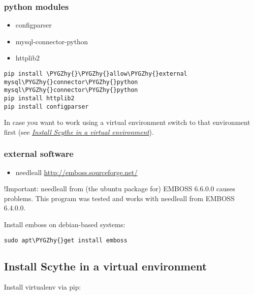 \documentclass[letterpaper,10pt,english]{sphinxmanual}
\def\PYGZhy{\char`\-}
\begin{document}
\subsubsection{python modules}
\label{Tutorial:python-modules}\begin{itemize}
\item {} 
configparser

\item {} 
mysql-connector-python

\item {} 
httplib2

\end{itemize}

\begin{Verbatim}[commandchars=\\\{\}]
pip install \PYGZhy{}\PYGZhy{}allow\PYGZhy{}external mysql\PYGZhy{}connector\PYGZhy{}python mysql\PYGZhy{}connector\PYGZhy{}python
pip install httplib2
pip install configparser
\end{Verbatim}

In case you want to work using a virtual environment switch to that environment first (see {\hyperref[Tutorial:install-virt]{\emph{Install Scythe in a virtual environment}}}).


\subsubsection{external software}
\label{Tutorial:external-software}\begin{itemize}
\item {} 
needleall \href{http://emboss.sourceforge.net/}{http://emboss.sourceforge.net/}

\end{itemize}

!Important: needleall from (the ubuntu package for) EMBOSS 6.6.0.0 causes problems. This program was tested and works with needleall from EMBOSS 6.4.0.0.

Install emboss on debian-based systems:

\begin{Verbatim}[commandchars=\\\{\}]
sudo apt\PYGZhy{}get install emboss
\end{Verbatim}


\subsection{Install Scythe in a virtual environment}
\label{Tutorial:install-scythe-in-a-virtual-environment}\label{Tutorial:install-virt}
Install virtualenv via pip:
\end{document}
